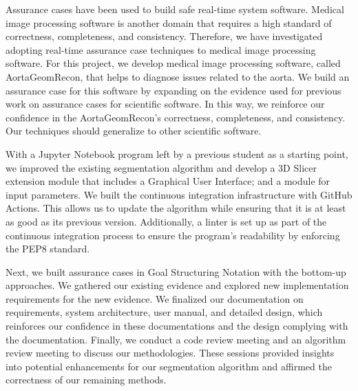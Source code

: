 
Assurance cases have been used to build safe real-time system software. Medical image processing software is another domain that requires a high standard of correctness, completeness, and consistency. Therefore, we have investigated adopting real-time assurance case techniques to medical image processing software. For this project, we develop medical image processing software, called AortaGeomRecon, that helps to diagnose issues related to the aorta. We build an assurance case for this software by expanding on the evidence used for previous work on assurance cases for scientific software. In this way, we reinforce our confidence in the AortaGeomRecon's correctness, completeness, and consistency. Our techniques should generalize to other scientific software.

With a Jupyter Notebook program left by a previous student as a starting point, we improved the existing segmentation algorithm and develop a 3D Slicer extension module that includes a Graphical User Interface; and a module for input parameters. We built the continuous integration infrastructure with GitHub Actions. This allows us to update the algorithm while ensuring that it is at least as good as its previous version. Additionally, a linter is set up as part of the continuous integration process to ensure the program's readability by enforcing the PEP8 standard.

Next, we built assurance cases in Goal Structuring Notation with the bottom-up approaches. We gathered our existing evidence and explored new implementation requirements for the new evidence. We finalized our documentation on requirements, system architecture, user manual, and detailed design, which reinforces our confidence in these documentations and the design complying with the documentation. Finally, we conduct a code review meeting and an algorithm review meeting to discuss our methodologies. These sessions provided insights into potential enhancements for our segmentation algorithm and affirmed the correctness of our remaining methods.